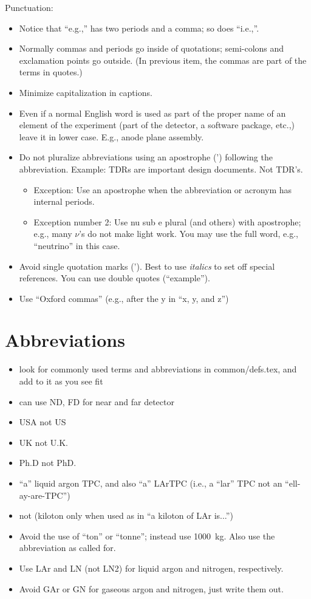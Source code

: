Punctuation:
\begin{itemize}
\item Notice that ``e.g.,'' has two periods and a comma; so does ``i.e.,''.
\item Normally commas and periods go inside of quotations;  semi-colons and exclamation points go outside.  (In previous item, the commas are part of the terms in quotes.)
\item Minimize capitalization in captions.
\item Even if a normal English word is used as part of the proper name of an element of the experiment (part of the detector, a software package, etc.,) leave it in lower case. E.g., anode plane assembly. 
\item Do not pluralize abbreviations using an apostrophe (') following the abbreviation. Example: TDRs are important design documents. Not TDR's. 
\begin{itemize}
\item Exception: Use an apostrophe when the abbreviation or acronym has internal periods. 
\item Exception number \num{2}: Use nu sub e plural (and others) with apostrophe; e.g., many $\nu$'s do not make light work. You may use the full word, e.g., ``neutrino'' in this case.
\end{itemize}
\item Avoid single quotation marks ('). Best to use \textit{italics} to set off special references. You can use double quotes (``example''). 
\item Use ``Oxford commas'' (e.g., after the y in ``x, y, and z'') 
\end{itemize}


\section{Abbreviations}
\label{sec:english-abbrevs}

\begin{itemize}
\item look for commonly used terms and abbreviations in common/defs.tex, and add to it as you see fit 
\item can use ND, FD for near and far detector
\item USA not US
\item UK not U.K. 
\item Ph.D not PhD.
\item ``a'' liquid argon TPC, and also ``a'' LArTPC (i.e., a ``lar'' TPC not an ``ell-ay-are-TPC'') 
\item \si{\kt} not \si{\kton} (kiloton only when used as in ``a kiloton of LAr is...'') 
\item Avoid the use of ``ton'' or ``tonne''; instead use \SI{1000}{\kilo\gram}. Also use the abbreviation \si{\kt} as called for.
\item Use LAr and LN (not LN2) for liquid argon and nitrogen, respectively. 
\item Avoid GAr or GN for gaseous argon and nitrogen, just write them out.
\end{itemize}


